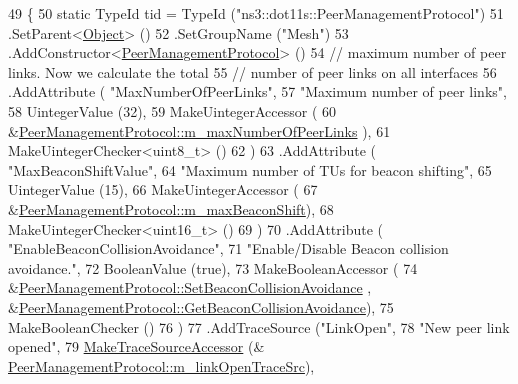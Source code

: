 \begin{DoxyCode}
49 \{
50   \textcolor{keyword}{static} TypeId tid = TypeId (\textcolor{stringliteral}{"ns3::dot11s::PeerManagementProtocol"})
51     .SetParent<\hyperlink{classns3_1_1Object_a40860402e64d8008fb42329df7097cdb}{Object}> ()
52     .SetGroupName (\textcolor{stringliteral}{"Mesh"})
53     .AddConstructor<\hyperlink{classns3_1_1dot11s_1_1PeerManagementProtocol_a0e568f7724fb71e5dc4aa88eca7f19e1}{PeerManagementProtocol}> ()
54     \textcolor{comment}{// maximum number of peer links. Now we calculate the total}
55     \textcolor{comment}{// number of peer links on all interfaces}
56     .AddAttribute ( \textcolor{stringliteral}{"MaxNumberOfPeerLinks"},
57                     \textcolor{stringliteral}{"Maximum number of peer links"},
58                     UintegerValue (32),
59                     MakeUintegerAccessor (
60                       &\hyperlink{classns3_1_1dot11s_1_1PeerManagementProtocol_a1cc5292332f46a548fd3ac6c2bec373a}{PeerManagementProtocol::m\_maxNumberOfPeerLinks}
      ),
61                     MakeUintegerChecker<uint8\_t> ()
62                     )
63     .AddAttribute ( \textcolor{stringliteral}{"MaxBeaconShiftValue"},
64                     \textcolor{stringliteral}{"Maximum number of TUs for beacon shifting"},
65                     UintegerValue (15),
66                     MakeUintegerAccessor (
67                       &\hyperlink{classns3_1_1dot11s_1_1PeerManagementProtocol_a23968eb845fa63fe87f303d2e21e77f0}{PeerManagementProtocol::m\_maxBeaconShift}),
68                     MakeUintegerChecker<uint16\_t> ()
69                     )
70     .AddAttribute ( \textcolor{stringliteral}{"EnableBeaconCollisionAvoidance"},
71                     \textcolor{stringliteral}{"Enable/Disable Beacon collision avoidance."},
72                     BooleanValue (\textcolor{keyword}{true}),
73                     MakeBooleanAccessor (
74                       &\hyperlink{classns3_1_1dot11s_1_1PeerManagementProtocol_af7f617cc0deff9bd8e97ed4c3a77eeba}{PeerManagementProtocol::SetBeaconCollisionAvoidance}
      , &\hyperlink{classns3_1_1dot11s_1_1PeerManagementProtocol_ac97f472fcc281fb856f8434555cab024}{PeerManagementProtocol::GetBeaconCollisionAvoidance}),
75                     MakeBooleanChecker ()
76                     )
77     .AddTraceSource (\textcolor{stringliteral}{"LinkOpen"},
78                      \textcolor{stringliteral}{"New peer link opened"},
79                      \hyperlink{group__tracing_gab21a770b9855af4e8f69f7531ea4a6b0}{MakeTraceSourceAccessor} (&
      \hyperlink{classns3_1_1dot11s_1_1PeerManagementProtocol_a33560f4e34a457118de89f3ed3859d4e}{PeerManagementProtocol::m\_linkOpenTraceSrc}),

\end{DoxyCode}
